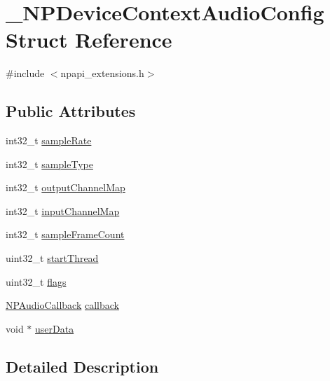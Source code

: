 \hypertarget{struct___n_p_device_context_audio_config}{
\section{\_\-NPDeviceContextAudioConfig Struct Reference}
\label{struct___n_p_device_context_audio_config}
}


{\ttfamily \#include $<$npapi\_\-extensions.h$>$}

\subsection*{Public Attributes}
\begin{DoxyCompactItemize}
\item 
int32\_\-t \hyperlink{struct___n_p_device_context_audio_config_ae8f165b45aa2bb33a84d4e62c320afef}{sampleRate}
\item 
int32\_\-t \hyperlink{struct___n_p_device_context_audio_config_a72368bc2db5c560fcfcec9f048fe7e93}{sampleType}
\item 
int32\_\-t \hyperlink{struct___n_p_device_context_audio_config_adc7b8d1ae23a27b833dd9816ca76c9b2}{outputChannelMap}
\item 
int32\_\-t \hyperlink{struct___n_p_device_context_audio_config_a69c0328c3256924a80490c75b643cfd9}{inputChannelMap}
\item 
int32\_\-t \hyperlink{struct___n_p_device_context_audio_config_a9845d796ed525af2eef523a8246d5fff}{sampleFrameCount}
\item 
uint32\_\-t \hyperlink{struct___n_p_device_context_audio_config_a4456ec356a3d5da2b9d05d8de19868ee}{startThread}
\item 
uint32\_\-t \hyperlink{struct___n_p_device_context_audio_config_a50ce2ce4d00b584205cdfe725d43c760}{flags}
\item 
\hyperlink{npapi__extensions_8h_ac16a100eeec4f1d8a44e1d4e4a55cd31}{NPAudioCallback} \hyperlink{struct___n_p_device_context_audio_config_a913925b7c8aceb040e26433e9b68b577}{callback}
\item 
void $\ast$ \hyperlink{struct___n_p_device_context_audio_config_a02dc164c09c13d1a97adde1544a0a787}{userData}
\end{DoxyCompactItemize}


\subsection{Detailed Description}


